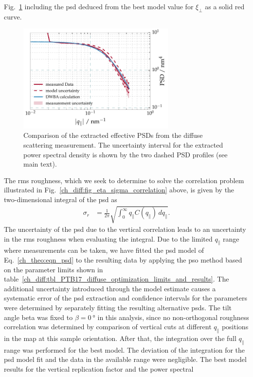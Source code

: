 Fig.~\ref{ch_diff:fig_CrSc_diffuse_PSD} including the \gls{psd} deduced from the best model 
value for $\xi_\perp$ as a solid red curve.
\begin{figure}[htbp]
  \centering
  \includegraphics[width=0.7\textwidth]{img/CrSc_diffuse_PSD}
  \caption{Comparison of the extracted effective PSDs from the diffuse 
scattering measurement. The 
uncertainty interval for the extracted power spectral density is shown by the 
two dashed PSD profiles (see main text).}
  \label{ch_diff:fig_CrSc_diffuse_PSD}
\end{figure}
The \gls{rms} roughness, which we seek to determine to solve the correlation problem illustrated in Fig.~\ref{ch_diff:fig_eta_sigma_correlation} above, is given by the two-dimensional integral of the \gls{psd} as
\begin{align}
\sigma_r &=\frac{1}{2\pi} \sqrt{\int_{0}^{\infty} q_\parallel C(q_\parallel) \, 
dq_\parallel} \text{.}
\end{align}
The uncertainty of the \gls{psd} due to the vertical correlation leads to an 
uncertainty in the \gls{rms} roughness when evaluating the integral. Due to the 
limited $q_\parallel$ range where measurements can be taken, we have fitted the 
\gls{psd} model of Eq.~\eqref{ch_theo:eqn_psd} to the resulting data by applying the \gls{pso} method based on the parameter limits shown in table~\ref{ch_diff:tbl_PTB17_diffuse_optimization_limits_and_results}. The additional uncertainty introduced through the model estimate causes a systematic error of the \gls{psd} extraction and confidence intervals for the parameters were determined by separately fitting the resulting alternative \gls{psd}s. The tilt angle beta was fixed to $\beta=\SI{0}{\degree}$ in this analysis, since no non-orthogonal roughness correlation was determined by comparison of vertical cuts at different $q_\parallel$ positions in the map at this sample orientation. After that, the integration over the full $q_\parallel$ range was performed for the best model. The deviation of the integration for the \gls{psd} model fit and the data in the available range were negligible. The best model results for the vertical replication factor and the power spectral 

